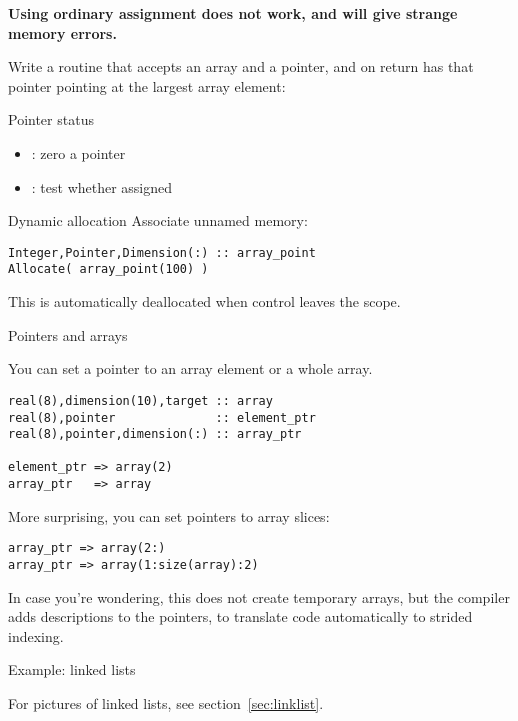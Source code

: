 \textbf{Using ordinary assignment does not work, and will give strange
  memory errors.}

\begin{exercise}
  \label{ex:fpoint-fun}
  Write a routine that accepts an array and a pointer, and on return
  has that pointer pointing at the largest array element:
\end{exercise}

\begin{block}{Pointer status}
  \label{sl:fpoint-stat}
  \begin{itemize}
  \item {}: zero a pointer
  \item {}: test whether assigned
  \end{itemize}  
\end{block}

\begin{block}{Dynamic allocation}
  \label{sl:fpoint-dynamic}
  Associate unnamed memory:
\begin{verbatim}
Integer,Pointer,Dimension(:) :: array_point
Allocate( array_point(100) )
\end{verbatim}  
This is automatically deallocated when control leaves the scope.
\end{block}

 {Pointers and arrays}

You can set a pointer to an array element or a whole array.
\begin{verbatim}
real(8),dimension(10),target :: array
real(8),pointer              :: element_ptr
real(8),pointer,dimension(:) :: array_ptr

element_ptr => array(2)
array_ptr   => array
\end{verbatim}
More surprising, you can set pointers to array slices:
\begin{verbatim}
array_ptr => array(2:)
array_ptr => array(1:size(array):2)
\end{verbatim}

In case you're wondering, this does not create temporary arrays, but
the compiler adds descriptions to the pointers, to translate code
automatically to strided indexing.

 {Example: linked lists}

For pictures of linked lists, see section~\ref{sec:linklist}.

